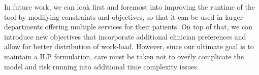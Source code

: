 In future work, we can look first and foremost into improving the runtime of the tool by modifying constraints and objectives, so that it can be used in larger departments offering multiple services for their patients. On top of that, we can introduce new objectives that incorporate additional clinician preferences and allow for better distribution of work-load. However, since our ultimate goal is to maintain a ILP formulation, care must be taken not to overly complicate the model and risk running into additional time complexity issues.